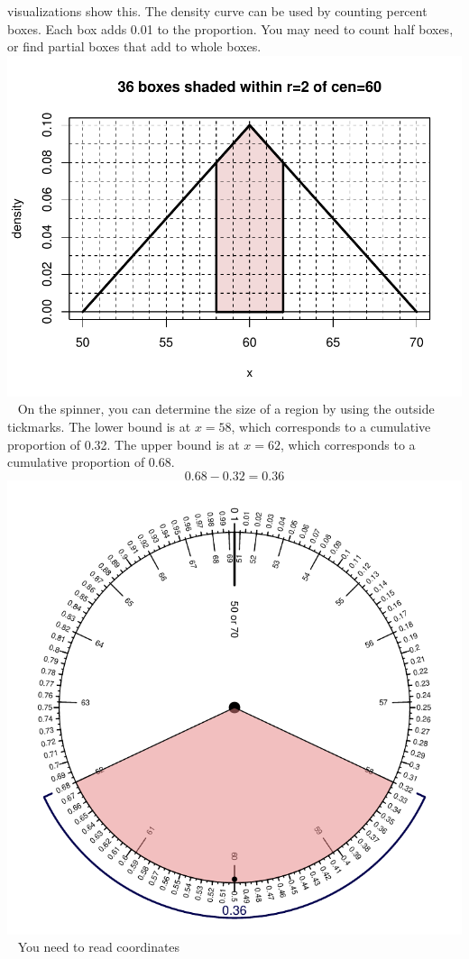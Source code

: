 \begin{solution}
\begin{answerlist}
visualizations show this. The density curve can be used by counting
percent boxes. Each box adds 0.01 to the proportion. You may need to
count half boxes, or find partial boxes that add to whole boxes.
\includegraphics{unnamed-chunk-11-1.pdf} ~ On the spinner, you can
determine the size of a region by using the outside tickmarks. The lower
bound is at \(x=58\), which corresponds to a cumulative proportion of
0.32. The upper bound is at \(x=62\), which corresponds to a cumulative
proportion of 0.68. \[0.68-0.32=0.36\]
\includegraphics{unnamed-chunk-12-1.pdf} ~ You need to read coordinates

\end{answerlist}
\end{solution}
